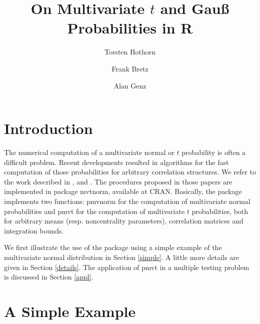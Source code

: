 \documentclass[11pt]{amsart}
\begin{document}
\title{On Multivariate $t$ and Gau{\ss} Probabilities in R}

\author{Torsten Hothorn}
\address{Friedrich-Alexander-Universit\"at Erlangen-N\"urnberg \\
Institut f\"ur Medizininformatik, Biometrie und Epidemiologie \\
Waldstra{\ss}e 6, D-91054 Erlangen}
\author{Frank Bretz}
\address{Universit\"at Hannover \\ LG Bioinformatik, FB Gartenbau \\
Herrenh\"auser Str. 2 \\ D-30419 Hannover}
\author{Alan Genz}
\address{Department of Mathematics \\ Washington State University \\
Pullman, WA 99164-3113 USA}

\maketitle

\section*{Introduction}

The numerical computation of a multivariate normal or $t$ probability is
often a difficult problem. Recent developments resulted in algorithms for
the fast computation of those probabilities for arbitrary correlation
structures. We refer to the work described in \cite{numerical-:1992},
\cite{comparison:1993} and \cite{numerical-:1999}. The procedures proposed
in those papers are implemented in package {\ttfamily mvtnorm}, available at
CRAN. Basically, the package implements two functions: {\ttfamily pmvnorm}
for the computation of multivariate normal probabilities and {\ttfamily
pmvt} for the computation of multivariate $t$ probabilities, both for
arbitrary means (resp. noncentrality parameters), correlation matrices
and integration bounds.

We first illustrate the use of the package using a simple example of the
multivariate normal distribution in Section \ref{simple}. 
A little more details are given in Section \ref{details}. The application of
{\ttfamily pmvt} in a multiple testing problem is discussed in Section
\ref{appl}.

\section{A Simple Example \label{simple}}
\end{document}
